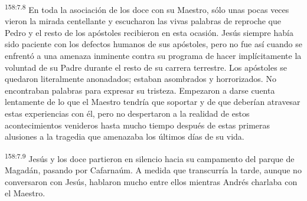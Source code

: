 {\par 
\textsuperscript{158:7.8} En toda la asociación de los doce con su Maestro, sólo unas pocas veces vieron la mirada centellante y escucharon las vivas palabras de reproche que Pedro y el resto de los apóstoles recibieron en esta ocasión. Jesús siempre había sido paciente con los defectos humanos de sus apóstoles, pero no fue así cuando se enfrentó a una amenaza inminente contra su programa de hacer implícitamente la voluntad de su Padre durante el resto de su carrera terrestre. Los apóstoles se quedaron literalmente anonadados; estaban asombrados y horrorizados. No encontraban palabras para expresar su tristeza. Empezaron a darse cuenta lentamente de lo que el Maestro tendría que soportar y de que deberían atravesar estas experiencias con él, pero no despertaron a la realidad de estos acontecimientos venideros hasta mucho tiempo después de estas primeras alusiones a la tragedia que amenazaba los últimos días de su vida.

\par 
\textsuperscript{158:7.9} Jesús y los doce partieron en silencio hacia su campamento del parque de Magadán, pasando por Cafarnaúm. A medida que transcurría la tarde, aunque no conversaron con Jesús, hablaron mucho entre ellos mientras Andrés charlaba con el Maestro.

}
